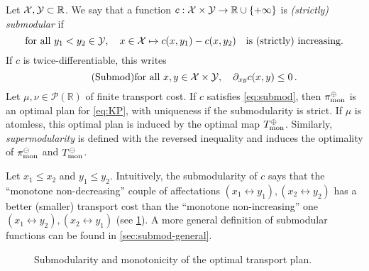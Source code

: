         \begin{proposition}[Submodularity]
            \label{prop:submod}
            Let $\mathcal{X},\mathcal{Y}\subset\mathbb{R}$. We say that a function $c:\mathcal{X}\times\mathcal{Y}\to\mathbb{R}\cup \{ +\infty \}$ is \emph{(strictly) submodular} if
            \begin{equation*}
                \text{for all } y_1< y_2\in\mathcal{Y},\quad x\in\mathcal{X}\mapsto c(x,y_1)-c(x,y_2)\quad \text{is (strictly) increasing.}
            \end{equation*}
            If $c$ is twice-differentiable, this writes
            \begin{equation}
                \tag{Submod}
                \text{for all } x,y\in\mathcal{X}\times\mathcal{Y},\quad \partial_{xy}c(x,y)\leq0\,.
                \label{eq:submod}
            \end{equation}
            Let $\mu,\nu \in\mathcal{P}(\mathbb{R})$ of finite transport cost. If $c$ satisfies \cref{eq:submod}, then $\pi_\text{mon}^\oplus$ is an optimal plan for \cref{eq:KP}, with uniqueness if the submodularity is strict. If $\mu$ is atomless, this optimal plan is induced by the optimal map $T_\text{mon}^\oplus$. Similarly, \emph{supermodularity} is defined with the reversed inequality and induces the optimality of $\pi_\text{mon}^\ominus$ and $T_\text{mon}^\ominus$.
        \end{proposition}
        \begin{remark}
            Let $x_1\leq x_2$ and $y_1\leq y_2$. Intuitively, the submodularity of $c$ says that the ``monotone non-decreasing'' couple of affectations $(x_1\leftrightarrow y_1),(x_2\leftrightarrow y_2)$ has a better (smaller) transport cost than the ``monotone non-increasing'' one $(x_1\leftrightarrow y_2),(x_2\leftrightarrow y_1)$ (see \cref{fig:submod}).
            A more general definition of submodular functions can be found in \cref{sec:submod-general}.
        \end{remark}
        \begin{figure}[H]
            \centering
            
            \caption{Submodularity and monotonicity of the optimal transport plan.}
            \label{fig:submod}
        \end{figure}
